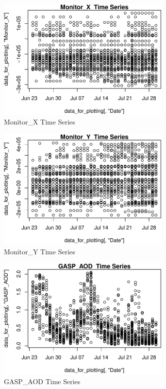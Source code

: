 \begin{figure} 
\centering  
\includegraphics[width=0.77\textwidth]{Code_Outputs/ML_input_report_AllforCaret_cleaned_StepPractice_part_practice_Monitor_XTS.pdf} 
\caption{\label{fig:ML_input_report_AllforCaret_cleaned_StepPractice_part_practiceMonitor_XTS}Monitor_X  Time Series} 
\end{figure} 
 

\begin{figure} 
\centering  
\includegraphics[width=0.77\textwidth]{Code_Outputs/ML_input_report_AllforCaret_cleaned_StepPractice_part_practice_Monitor_YTS.pdf} 
\caption{\label{fig:ML_input_report_AllforCaret_cleaned_StepPractice_part_practiceMonitor_YTS}Monitor_Y  Time Series} 
\end{figure} 
 

\begin{figure} 
\centering  
\includegraphics[width=0.77\textwidth]{Code_Outputs/ML_input_report_AllforCaret_cleaned_StepPractice_part_practice_GASP_AODTS.pdf} 
\caption{\label{fig:ML_input_report_AllforCaret_cleaned_StepPractice_part_practiceGASP_AODTS}GASP_AOD  Time Series} 
\end{figure} 
 

